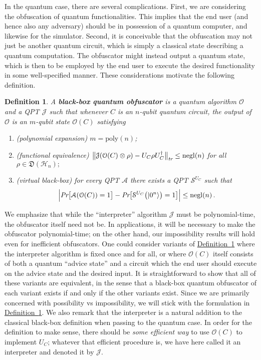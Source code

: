 \documentclass[11pt]{article}
\numberwithin{equation}{section}
\newtheorem{definition}{Definition}
\newcommand{\opn}{\operatorname}
\newcommand{\expref}[2]{\texorpdfstring{\hyperref[#2]{#1~\ref{#2}}}{#1~\ref{#2}}}
\newcommand{\algo}{\mathcal}
\newcommand{\negl}{\opn{negl}}
\newcommand{\states}{\mathfrak D}
\begin{document}
{In the quantum case, there are several complications. First, we are considering the obfuscation of quantum functionalities. This implies that the end user (and hence also any adversary) should be in possession of a quantum computer, and likewise for the simulator. Second, it is conceivable that the obfuscation may not just be another quantum circuit, which is simply a classical state describing a quantum computation. The obfuscator might instead output a quantum state, which is then to be employed by the end user to execute the desired functionality in some well-specified manner. These considerations motivate the following definition.
\begin{definition}\label{def:vbb-obfuscator}
A \textbf{black-box quantum obfuscator} is a quantum algorithm $\algo O$ and a QPT $\algo J$ such that whenever $C$ is an $n$-qubit quantum circuit, the output of $\algo O$ is an $m$-qubit state $\algo O(C)$ satisfying
\begin{enumerate}
\item (polynomial expansion) $m = \text{poly}(n)$;
\item (functional equivalence) $\bigl\| \algo J ( \algo O(C) \otimes \rho ) - U_C \rho U_C^\dagger \bigr\|_\emph{tr} \leq \negl(n)$ for all $\rho \in \states(\mathcal H_n);$
\item (virtual black-box) for every QPT $\mathcal A$ there exists a QPT $\mathcal S^{U_C}$ such that
$$
\Bigl| \emph{Pr}\bigl[\mathcal A(\mathcal O(C)) = 1\bigr] - \emph{Pr}\bigl[\mathcal S^{U_C}\bigl(\ket{0^n}\bigr) = 1\bigr] \Bigr| \leq \negl(n)\,.
$$
\end{enumerate}
\end{definition}
We emphasize that while the ``interpreter'' algorithm $\algo J$ must be polynomial-time, the obfuscator itself need not be. In applications, it will be necessary to make the obfuscator polynomial-time; on the other hand, our impossibility results will hold even for inefficient obfuscators. One could consider variants of \expref{Definition}{def:vbb-obfuscator} where the interpreter algorithm is fixed once and for all, or where $\algo O(C)$ itself consists of both a quantum ``advice state'' and a circuit which the end user should execute on the advice state and the desired input. It is straightforward to show that all of these variants are equivalent, in the sense that a black-box quantum obfuscator of each variant exists if and only if the other variants exist. Since we are primarily concerned with possibility vs impossibility, we will stick with the formulation in \expref{Definition}{def:vbb-obfuscator}. We also remark that the interpreter is a natural addition to the classical black-box definition when passing to the quantum case. In order for the definition to make sense, there should be \emph{some efficient way} to use $\algo O(C)$ to implement $U_C$; whatever that efficient procedure is, we have here called it an interpreter and denoted it by $\algo J$.

}
\end{document}
